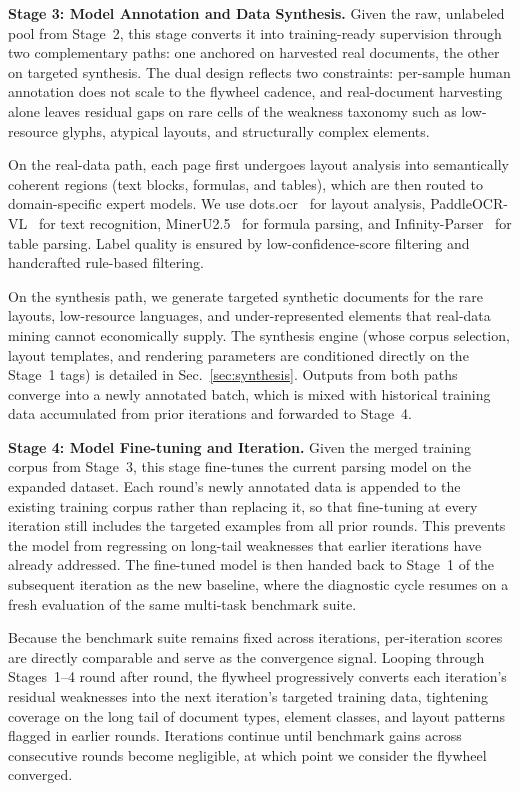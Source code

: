 \textbf{Stage 3: Model Annotation and Data Synthesis.} Given the raw, unlabeled pool from Stage~2, this stage converts it into training-ready supervision through two complementary paths: one anchored on harvested real documents, the other on targeted synthesis. The dual design reflects two constraints: per-sample human annotation does not scale to the flywheel cadence, and real-document harvesting alone leaves residual gaps on rare cells of the weakness taxonomy such as low-resource glyphs, atypical layouts, and structurally complex elements.

On the real-data path, each page first undergoes layout analysis into semantically coherent regions (text blocks, formulas, and tables), which are then routed to domain-specific expert models. We use dots.ocr~\cite{dotsocr2025} for layout analysis, PaddleOCR-VL~\cite{cui2025paddleocr} for text recognition, MinerU2.5~\cite{niu2025mineru2} for formula parsing, and Infinity-Parser~\cite{wang2025infinity} for table parsing. Label quality is ensured by low-confidence-score filtering and handcrafted rule-based filtering.

On the synthesis path, we generate targeted synthetic documents for the rare layouts, low-resource languages, and under-represented elements that real-data mining cannot economically supply. The synthesis engine (whose corpus selection, layout templates, and rendering parameters are conditioned directly on the Stage~1 tags) is detailed in Sec.~\ref{sec:synthesis}. Outputs from both paths converge into a newly annotated batch, which is mixed with historical training data accumulated from prior iterations and forwarded to Stage~4.

\textbf{Stage 4: Model Fine-tuning and Iteration.} Given the merged training corpus from Stage~3, this stage fine-tunes the current parsing model on the expanded dataset. Each round's newly annotated data is appended to the existing training corpus rather than replacing it, so that fine-tuning at every iteration still includes the targeted examples from all prior rounds. This prevents the model from regressing on long-tail weaknesses that earlier iterations have already addressed. The fine-tuned model is then handed back to Stage~1 of the subsequent iteration as the new baseline, where the diagnostic cycle resumes on a fresh evaluation of the same multi-task benchmark suite.

Because the benchmark suite remains fixed across iterations, per-iteration scores are directly comparable and serve as the convergence signal. Looping through Stages~1--4 round after round, the flywheel progressively converts each iteration's residual weaknesses into the next iteration's targeted training data, tightening coverage on the long tail of document types, element classes, and layout patterns flagged in earlier rounds. Iterations continue until benchmark gains across consecutive rounds become negligible, at which point we consider the flywheel converged.

